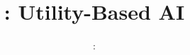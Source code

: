 \usepackage[T1]{fontenc}
\usepackage{../../beamerthemeFalmouthGamesAcademy}
\usepackage{multimedia}
\graphicspath{ {../../} }


\usepackage[normalem]{ulem}
\usepackage{wasysym}

\usepackage{pdfpages}

\usetikzlibrary{arrows,automata}

\usepackage{pgfplots}
\pgfplotsset{width=\textwidth,height=0.6\textheight,compat=1.9}




\title{\sessionnumber: Utility-Based AI}
\subtitle{\modulecode: \moduletitle}

\frame{\titlepage} 





